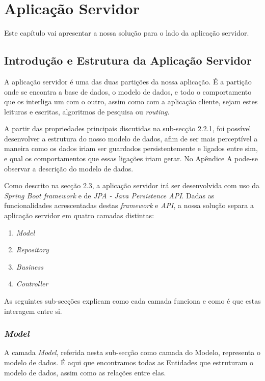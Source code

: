 \chapter{Aplicação Servidor} \label{cap:exemplos}

Este capítulo vai apresentar a nossa solução para o lado da aplicação servidor.

\section{Introdução e Estrutura da Aplicação Servidor} \label{sec31}
A aplicação servidor é uma das duas partições da nossa aplicação. É a partição onde se encontra a base de dados, o modelo de dados, e todo o comportamento que os interliga um com o outro, assim como com a aplicação cliente, sejam estes leituras e escritas, algoritmos de pesquisa ou \emph{routing}.

A partir das propriedades principais discutidas na sub-secção 2.2.1, foi possível desenvolver a estrutura do nosso modelo de dados, afim de ser mais perceptível a maneira como os dados iriam ser guardados persistentemente e ligados entre sim, e qual os comportamentos que essas ligações iriam gerar. No Apêndice A pode-se observar a descrição do modelo de dados.

Como descrito na secção 2.3, a aplicação servidor irá ser desenvolvida com uso da \emph{Spring Boot framework} e de 
\emph{JPA - Java Persistence API}. Dadas as funcionalidades acrescentadas destas \emph{framework} e \emph{API}, a nossa solução separa a aplicação servidor em quatro camadas distintas:
\begin{enumerate}
	\item \emph{Model}
	\item \emph{Repository}
	\item \emph{Business}
	\item \emph{Controller}
\end{enumerate}
As seguintes sub-secções explicam como cada camada funciona e como é que estas interagem entre si.

\subsection{\emph{Model}} \label{sec311}
A camada \emph{Model}, referida nesta sub-secção como camada do Modelo, representa o modelo de dados. É aqui que encontramos todas as Entidades que estruturam o modelo de dados, assim como as relações entre elas. 

